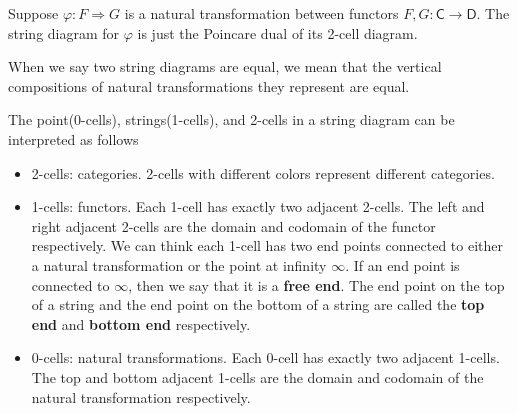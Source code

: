 Suppose $\varphi:F\Rightarrow G$ is a natural transformation between functors $F,G:\mathsf{C}\to \mathsf{D}$. The string diagram for $\varphi$ is just the Poincare dual of its 2-cell diagram. 

\begin{center}
    \hspace{1cm}
\end{center}

When we say two string diagrams are equal, we mean that the vertical compositions of natural transformations they represent are equal.

The point(0-cells), strings(1-cells), and 2-cells in a string diagram can be interpreted as follows
\begin{itemize}
    \item 2-cells: categories. 2-cells with different colors represent different categories.
    \item 1-cells: functors. Each 1-cell has exactly two adjacent 2-cells. The left and right adjacent 2-cells are the domain and codomain of the functor respectively. We can think each 1-cell has two end points connected to either a natural transformation or the point at infinity $\infty$. If an end point is connected to $\infty$, then we say that it is a \textbf{free end}. The end point on the top of a string and the end point on the bottom of a string are called the \textbf{top end} and \textbf{bottom end} respectively.
    \item 0-cells: natural transformations. Each 0-cell has exactly two adjacent 1-cells. The top and bottom adjacent 1-cells are the domain and codomain of the natural transformation respectively. 
\end{itemize}

